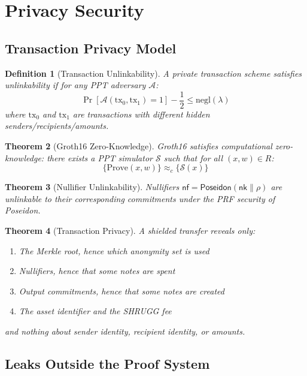 \documentclass[11pt,a4paper]{article}
\newtheorem{theorem}{Theorem}[section]
\newtheorem{definition}[theorem]{Definition}
\begin{document}
\section{Privacy Security}

\subsection{Transaction Privacy Model}

\begin{definition}[Transaction Unlinkability]
A private transaction scheme satisfies unlinkability if for any PPT adversary $\mathcal{A}$:
\[
\Pr[\mathcal{A}(\text{tx}_0, \text{tx}_1) = 1] - \frac{1}{2} \leq \text{negl}(\lambda)
\]
where $\text{tx}_0$ and $\text{tx}_1$ are transactions with different hidden senders/recipients/amounts.
\end{definition}

\begin{theorem}[Groth16 Zero-Knowledge]
Groth16 satisfies computational zero-knowledge: there exists a PPT simulator $\mathcal{S}$ such that for all $(x, w) \in R$:
\[
\{\text{Prove}(x, w)\} \approx_c \{\mathcal{S}(x)\}
\]
\end{theorem}

\begin{theorem}[Nullifier Unlinkability]
Nullifiers $\mathsf{nf} = \mathsf{Poseidon}(\mathsf{nk} \| \rho)$ are unlinkable to their corresponding commitments under the PRF security of Poseidon.
\end{theorem}

\begin{theorem}[Transaction Privacy]
A shielded transfer reveals only:
\begin{enumerate}
    \item The Merkle root, hence which anonymity set is used
    \item Nullifiers, hence that some notes are spent
    \item Output commitments, hence that some notes are created
    \item The asset identifier and the SHRUGG fee
\end{enumerate}
and nothing about sender identity, recipient identity, or amounts.
\end{theorem}

\subsection{Leaks Outside the Proof System}
\end{document}
